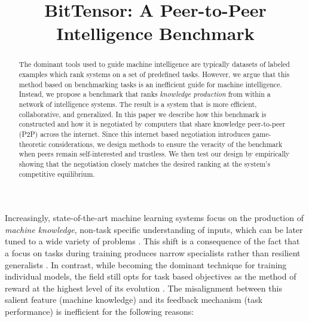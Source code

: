 \documentclass{article}
\title{BitTensor: A Peer-to-Peer Intelligence Benchmark}
\begin{document}
\maketitle

\begin{abstract}
The dominant tools used to guide machine intelligence are typically datasets of labeled examples which rank systems on a set of predefined tasks. However, we argue that this method based on benchmarking tasks is an inefficient guide for machine intelligence. Instead, we propose a benchmark that ranks \textit{knowledge production} from within a network of intelligence systems. The result is a system that is more efficient, collaborative, and generalized. In this paper we describe how this benchmark is constructed and how it is negotiated by computers that share knowledge peer-to-peer (P2P) across the internet. Since this internet based negotiation introduces game-theoretic considerations, we design methods to ensure the veracity of the benchmark when peers remain self-interested and trustless. We then test our design by empirically showing that the negotiation closely matches the desired ranking at the system's competitive equilibrium. 

\end{abstract}

Increasingly, state-of-the-art machine learning systems focus on the production of \textit{machine knowledge}, non-task specific understanding of inputs, which can be later tuned to a wide variety of problems \cite{devlin2018bert}. This shift is a consequence of the fact that a focus on tasks during training produces narrow specialists rather than resilient generalists \cite{radford2019language}. In contrast, while becoming the dominant technique for training individual models, the field still opts for task based objectives as the method of reward at the highest level of its evolution \cite{wang2018glue}. The misalignment between this salient feature (machine knowledge) and its feedback mechanism (task performance) is inefficient for the following reasons:
\end{document}
